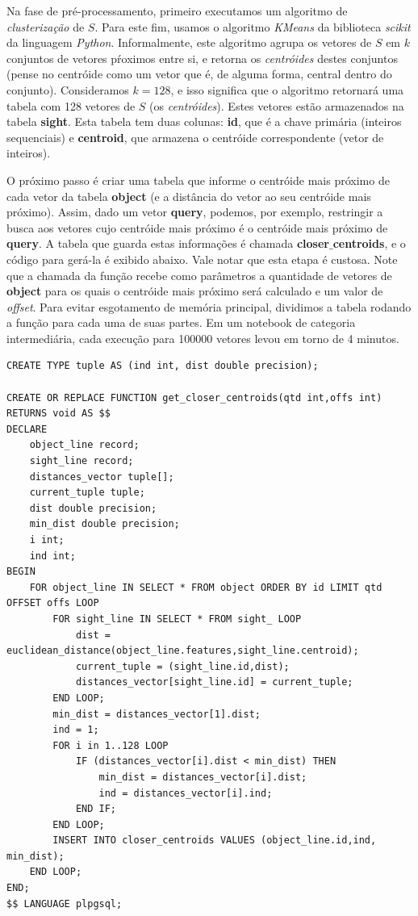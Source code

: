 \documentclass[a4paper,12pt,titlepage]{scrartcl}
\begin{document}
Na fase de pré-processamento, primeiro executamos um algoritmo de \emph{clusterização} de $S$. Para este fim, usamos o algoritmo \emph{KMeans} da biblioteca \emph{scikit} da linguagem \emph{Python}. Informalmente, este algoritmo agrupa os vetores de $S$ em $k$ conjuntos de vetores pŕoximos entre si, e retorna os \emph{centróides} destes conjuntos (pense no centróide como um vetor que é, de alguma forma, central dentro do conjunto). Consideramos $k = 128$, e isso significa que o algoritmo retornará uma tabela com 128 vetores de $S$ (os \emph{centróides}). Estes vetores estão armazenados na tabela \textbf{sight}. Esta tabela tem duas colunas: \textbf{id}, que é a chave primária (inteiros sequenciais) e \textbf{centroid}, que armazena o centróide correspondente (vetor de inteiros). 

O próximo passo é criar uma tabela que informe o centróide mais próximo de cada vetor da tabela \textbf{object} (e a distância do vetor ao seu centróide mais próximo). Assim, dado um vetor \textbf{query}, podemos, por exemplo, restringir a busca aos vetores cujo centróide mais próximo é o centróide mais próximo de \textbf{query}. A tabela que guarda estas informações é chamada \textbf{closer$\_$centroids}, e o código para gerá-la é exibido abaixo. Vale notar que esta etapa é custosa. Note que a chamada da função recebe como parâmetros a quantidade de vetores de \textbf{object} para os quais o centróide mais próximo será calculado e um valor de \emph{offset}. Para evitar esgotamento de memória principal, dividimos a tabela rodando a função para cada uma de suas partes. Em um notebook de categoria intermediária, cada execução para 100000 vetores levou em torno de 4 minutos. \\

\begin{lstlisting}[caption = Obtendo a tabela de centróides mais próximos, label = closcent]
CREATE TYPE tuple AS (ind int, dist double precision);

CREATE OR REPLACE FUNCTION get_closer_centroids(qtd int,offs int) RETURNS void AS $$
DECLARE
	object_line record;
	sight_line record;
	distances_vector tuple[];
	current_tuple tuple;
	dist double precision;
	min_dist double precision;
	i int;
	ind int;
BEGIN
	FOR object_line IN SELECT * FROM object ORDER BY id LIMIT qtd OFFSET offs LOOP
		FOR sight_line IN SELECT * FROM sight_ LOOP
			dist = euclidean_distance(object_line.features,sight_line.centroid);
			current_tuple = (sight_line.id,dist);
			distances_vector[sight_line.id] = current_tuple;
		END LOOP;
		min_dist = distances_vector[1].dist;
		ind = 1;
		FOR i in 1..128 LOOP
			IF (distances_vector[i].dist < min_dist) THEN
				min_dist = distances_vector[i].dist;
				ind = distances_vector[i].ind;
			END IF;
		END LOOP;
		INSERT INTO closer_centroids VALUES (object_line.id,ind, min_dist);
	END LOOP;
END;
$$ LANGUAGE plpgsql;

\end{lstlisting}
\vspace{5mm}
\end{document}
